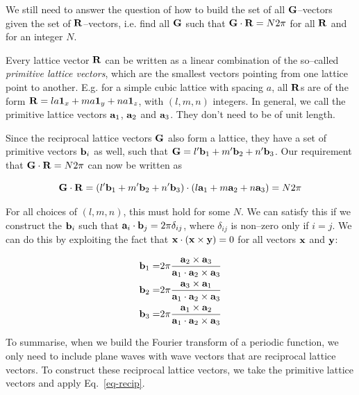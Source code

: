We still need to answer the question of how to build the set of all ${\bf G}$--vectors given the set of ${\bf R}$--vectors, i.e. find all ${\bf G}$ such that ${\bf G} \cdot {\bf R} = N 2 \pi$ for all ${\bf R}$ and for an integer $N$.

Every lattice vector ${\bf R}$ can be written as a linear combination of the so--called \emph{primitive lattice vectors}, which are the smallest vectors pointing from one lattice point to another. E.g. for a simple cubic lattice with spacing $a$, all ${\bf R}$s are of the form ${\bf R} = la {\bf 1}_x + ma {\bf 1}_y + na {\bf 1}_z$, with $(l,m,n)$ integers. In general, we call the primitive lattice vectors ${\bf a}_1$, ${\bf a}_2$ and ${\bf a}_3$. They don't need to be of unit length.

Since the reciprocal lattice vectors ${\bf G}$ also form a lattice, they have a set of primitive vectors ${\bf b}_i$ as well, such that ${\bf G} = l' {\bf b}_1 + m' {\bf b}_2 + n' {\bf b}_3$. Our requirement that ${\bf G} \cdot {\bf R} = N 2 \pi$ can now be written as

\begin{equation}
{\bf G} \cdot {\bf R} = ( l' {\bf b}_1 + m' {\bf b}_2 + n' {\bf b}_3) \cdot (l {\bf a}_1 + m {\bf a}_2 + n {\bf a}_3)  = N 2 \pi 
\end{equation} 

For all choices of $(l,m,n)$, this must hold for some $N$. We can satisfy this if we construct the ${\bf b}_i$ such that ${\bf a}_i \cdot {\bf b}_j = 2 \pi \delta_{ij}$, where $\delta_{ij}$ is non--zero only if $i=j$. We can do this by exploiting the fact that $ {\bf x} \cdot ({\bf x} \times {\bf y}) = 0$ for all vectors ${\bf x}$ and ${\bf y}$:

\begin{align}
{\bf b}_1 =& 2 \pi \frac{{\bf a}_2 \times {\bf a}_3}{{\bf a}_1 \cdot {\bf a}_2 \times {\bf a}_3} \nonumber \\
{\bf b}_2 =& 2 \pi \frac{{\bf a}_3 \times {\bf a}_1}{{\bf a}_1 \cdot {\bf a}_2 \times {\bf a}_3} \nonumber \\
{\bf b}_3 =& 2 \pi \frac{{\bf a}_1 \times {\bf a}_2}{{\bf a}_1 \cdot {\bf a}_2 \times {\bf a}_3}
\label{eq-recip}
\end{align} 

To summarise, when we build the Fourier transform of a periodic function, we only need to include plane waves with wave vectors that are reciprocal lattice vectors. To construct these reciprocal lattice vectors, we take the primitive lattice vectors and apply Eq.~\ref{eq-recip}.

